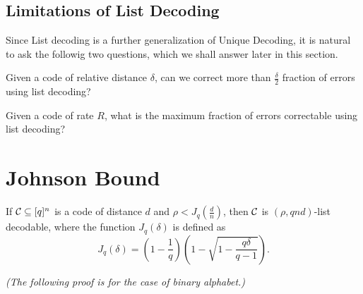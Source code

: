 	\subsection*{Limitations of List Decoding}
	Since List decoding is a further generalization of Unique Decoding, it is natural to ask the followig two questions, which we shall answer later in this section.
	\begin{question}[]
		\label{first}
		Given a code of relative distance $\delta$, can we correct more than $\frac{\delta}{2}$ fraction of errors using list decoding?		
	\end{question}
	
	\begin{question}[]
		Given a code of rate $R$, what is the maximum fraction of errors correctable using list decoding?
	\end{question}
	
	
	\section{Johnson Bound}
	\begin{theorem}[]
		\label{johnson}
		If $\mathcal{C}\subseteq[q]^n$ is a code of distance $d$ and $\rho<J_q(\frac{d}{n})$, then $\mathcal{C}$ is $(\rho, qnd)$-list decodable, where the function $J_q(\delta)$ is defined as 
		\[
		J_q(\delta) = \left( 1 - \frac{1}{q}\right)\left(1 - \sqrt{1-\frac{q\delta}{q-1}}\right).
		\]
	\end{theorem}
	\emph{(The following proof is for the case of binary alphabet.)}
	
